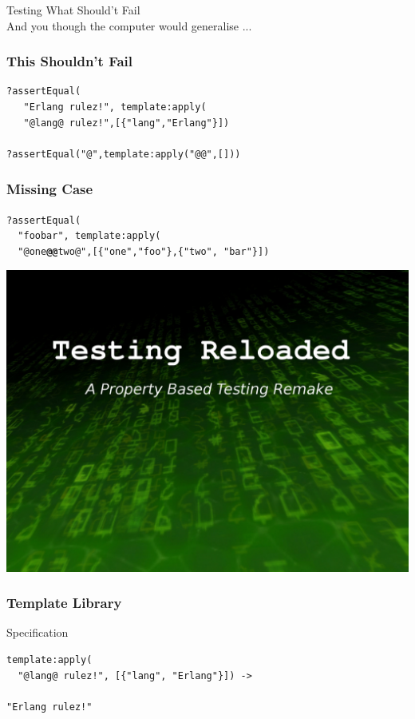 \documentclass[xcolor=dvipsnames]{beamer}
\begin{document}
\begin{frame}
  \begin{center}
    {\huge Testing What Should't Fail}\\
    \vspace{1cm}
    And you though the computer would generalise ...
  \end{center}
\end{frame}

\begin{frame}[fragile]
  \frametitle{This Shouldn't Fail}

\begin{verbatim}
?assertEqual(
   "Erlang rulez!", template:apply(
   "@lang@ rulez!",[{"lang","Erlang"}])

?assertEqual("@",template:apply("@@",[]))
\end{verbatim}
\end{frame}

\begin{frame}[fragile]
  \frametitle{Missing Case}
\texttt{?assertEqual(}\\
\texttt{~~"foobar", template:apply(}\\
\texttt{~~"@one\alert{\textbf{@@}}two@",[\{"one","foo"\},\{"two", "bar"\}])}
\end{frame}

\begin{frame}[plain]
  \includegraphics[width=\textwidth]{images/matrix}
\end{frame}

\begin{frame}[fragile]
  \frametitle{Template Library}

  \begin{block}{Specification}%
\begin{verbatim}
template:apply(
  "@lang@ rulez!", [{"lang", "Erlang"}]) ->

"Erlang rulez!"
\end{verbatim}
  \end{block}
\end{frame}
\end{document}

